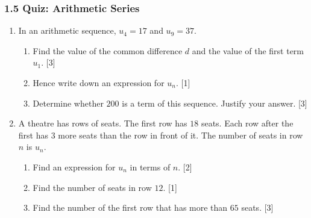 \documentclass[12pt, twoside]{article}
\begin{document}
\subsubsection*{1.5 Quiz: Arithmetic Series}

\begin{enumerate}[itemsep=0.15cm]

\item[1.] [Maximum mark: 7]

In an arithmetic sequence, $u_{4} = 17$ and $u_{9} = 37$.

\begin{enumerate}[itemsep=0.1cm]
  \item Find the value of the common difference $d$ and the value of
  the first term $u_{1}$. \hfill [3]
  \item Hence write down an expression for $u_{n}$. \hfill [1]
  \item Determine whether $200$ is a term of this sequence. Justify
  your answer. \hfill [3]
\end{enumerate}


\newpage

\item[2.] [Maximum mark: 6]

A theatre has rows of seats. The first row has $18$ seats. Each row
after the first has $3$ more seats than the row in front of it. The
number of seats in row $n$ is $u_{n}$.

\begin{enumerate}[itemsep=0.1cm]
  \item Find an expression for $u_{n}$ in terms of $n$. \hfill [2]
  \item Find the number of seats in row $12$. \hfill [1]
  \item Find the number of the first row that has more than $65$
  seats. \hfill [3]
\end{enumerate}


\end{enumerate}
\end{document}
